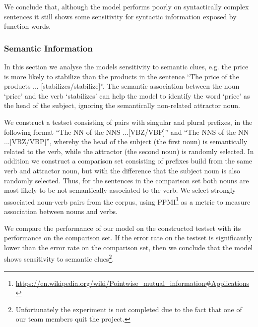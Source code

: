We conclude that, although the model 
performs poorly on syntactically complex sentences it
still shows some sensitivity for syntactic 
information exposed by function words. 


\subsubsection{Semantic Information}

In this section we analyse the models sensitivity
to semantic clues, e.g. the price is more likely
to stabilize than the products in the sentence
``The price of the products ... [stabilizes/stabilize]''.
The semantic association between the noun `price' and the
verb `stabilizes' can help the model to identify
the word `price' as the head of the subject,
ignoring the semantically non-related attractor noun.
  
We construct a testset consisting of pairs with singular and plural prefixes, in the following format  
``The NN of the NNS ...[VBZ/VBP]'' and
``The NNS of the NN ...[VBZ/VBP]'', 
whereby the head of the subject (the first noun)
is semantically related to the verb, while the attractor (the second noun)
is randomly selected. 
In addition we construct a comparison set consisting of prefixes
build from the same verb and attractor noun,
but with the difference that the subject noun is also randomly selected.
Thus, for the sentences in the comparison set both nouns
are most likely to be not semantically associated to the verb.
We select strongly associated noun-verb pairs from the corpus,
using PPMI\footnote{
\url{https://en.wikipedia.org/wiki/Pointwise_mutual_information\#Applications}
} as a metric to measure association between nouns and verbs. 

We compare the performance of our model on
the constructed testset with its performance
on the comparison set.
If the error rate on the testset is significantly
lower than the error rate on the comparison set,
then we conclude that the model shows sensitivity to semantic clues\footnote{Unfortunately the experiment is not completed
due to the fact that one of our team members quit the project.}.


